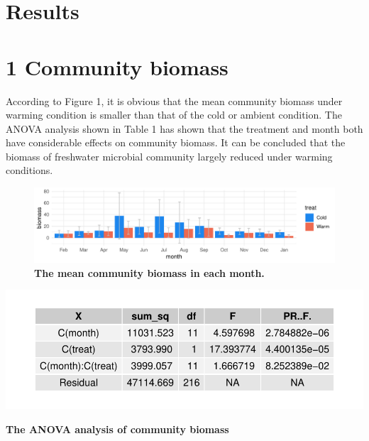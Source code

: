 \documentclass[11pt]{article}
\begin{document}
\begin{linenumbers}
\section*{Results}
\section*{1 Community biomass}
According to Figure 1, it is obvious that the mean community biomass under warming condition is smaller than that of the cold or ambient condition. The ANOVA analysis shown in Table 1 has shown that the treatment and month both have considerable effects on community biomass. It can be concluded that the biomass of freshwater microbial community largely reduced under warming conditions.
\begin{figure}[H]
  \centering
  \includegraphics[scale = 0.8]{../Graph/CommunityBiomassPlot.pdf}
  \caption{\textbf{The mean community biomass in each month.}  }
\end{figure}

\begin{table}[H]
  \centering
  \includegraphics[scale = 0.8]{../Graph/anova.pdf}
  \caption{\textbf{The ANOVA analysis of community biomass}  }
\end{table}


\end{linenumbers}
\end{document}
